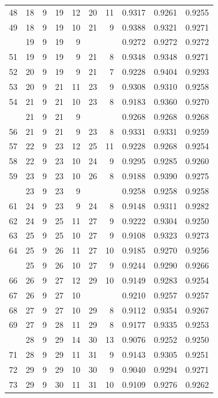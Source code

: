 \begin{Schunk}
\begin{longtable}{rrrrrrrrrr}
48 & 18 & 9 & 19 & 12 & 20 & 11 & 0.9317 & 0.9261 & 0.9255\\
49 & 18 & 9 & 19 & 10 & 21 & 9 & 0.9388 & 0.9321 & 0.9271\\
\addlinespace
50 & 19 & 9 & 19 & 9 &  &  & 0.9272 & 0.9272 & 0.9272\\
51 & 19 & 9 & 19 & 9 & 21 & 8 & 0.9348 & 0.9348 & 0.9271\\
52 & 20 & 9 & 19 & 9 & 21 & 7 & 0.9228 & 0.9404 & 0.9293\\
53 & 20 & 9 & 21 & 11 & 23 & 9 & 0.9308 & 0.9310 & 0.9258\\
54 & 21 & 9 & 21 & 10 & 23 & 8 & 0.9183 & 0.9360 & 0.9270\\
\addlinespace
55 & 21 & 9 & 21 & 9 &  &  & 0.9268 & 0.9268 & 0.9268\\
56 & 21 & 9 & 21 & 9 & 23 & 8 & 0.9331 & 0.9331 & 0.9259\\
57 & 22 & 9 & 23 & 12 & 25 & 11 & 0.9228 & 0.9268 & 0.9254\\
58 & 22 & 9 & 23 & 10 & 24 & 9 & 0.9295 & 0.9285 & 0.9260\\
59 & 23 & 9 & 23 & 10 & 26 & 8 & 0.9188 & 0.9390 & 0.9275\\
\addlinespace
60 & 23 & 9 & 23 & 9 &  &  & 0.9258 & 0.9258 & 0.9258\\
61 & 24 & 9 & 23 & 9 & 24 & 8 & 0.9148 & 0.9311 & 0.9282\\
62 & 24 & 9 & 25 & 11 & 27 & 9 & 0.9222 & 0.9304 & 0.9250\\
63 & 25 & 9 & 25 & 10 & 27 & 9 & 0.9108 & 0.9323 & 0.9273\\
64 & 25 & 9 & 26 & 11 & 27 & 10 & 0.9185 & 0.9270 & 0.9256\\
\addlinespace
65 & 25 & 9 & 26 & 10 & 27 & 9 & 0.9244 & 0.9290 & 0.9266\\
66 & 26 & 9 & 27 & 12 & 29 & 10 & 0.9149 & 0.9283 & 0.9254\\
67 & 26 & 9 & 27 & 10 &  &  & 0.9210 & 0.9257 & 0.9257\\
68 & 27 & 9 & 27 & 10 & 29 & 8 & 0.9112 & 0.9354 & 0.9267\\
69 & 27 & 9 & 28 & 11 & 29 & 8 & 0.9177 & 0.9335 & 0.9253\\
\addlinespace
70 & 28 & 9 & 29 & 14 & 30 & 13 & 0.9076 & 0.9252 & 0.9250\\
71 & 28 & 9 & 29 & 11 & 31 & 9 & 0.9143 & 0.9305 & 0.9251\\
72 & 29 & 9 & 29 & 10 & 30 & 9 & 0.9040 & 0.9294 & 0.9271\\
73 & 29 & 9 & 30 & 11 & 31 & 10 & 0.9109 & 0.9276 & 0.9262\\

\end{longtable}
\end{Schunk}
